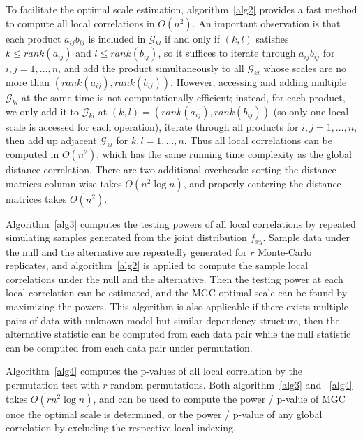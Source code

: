 \documentclass[11pt]{article}
\newcommand{\G}{\mathcal{G}}
\begin{document}
To facilitate the optimal scale estimation, algorithm~\ref{alg2} provides a fast method to compute all local correlations in $O(n^2)$. An important observation is that each product $a_{ij}b_{ij}$ is included in $\G_{kl}$ if and only if $(k,l)$ satisfies $k\leq rank(a_{ij})$ and $l\leq rank(b_{ij})$, so it suffices to iterate through $a_{ij}b_{ij}$ for $i,j=1,\ldots,n$, and add the product simultaneously to all $\G_{kl}$ whose scales are no more than $(rank(a_{ij}),rank(b_{ij}))$. However, accessing and adding multiple $\G_{kl}$ at the same time is not computationally efficient; instead, for each product, we only add it to $\G_{kl}$ at $(k,l)=(rank(a_{ij}),rank(b_{ij}))$ (so only one local scale is accessed for each operation), iterate through all products for $i,j=1,\ldots,n$, then add up adjacent $\G_{kl}$ for $k,l=1,\ldots,n$. Thus all local correlations can be computed in $O(n^2)$, which has the same running time complexity as the global distance correlation. There are two additional overheads: sorting the distance matrices column-wise takes $O(n^2 \log n)$, and properly centering the distance matrices takes $O(n^2)$. 

Algorithm~\ref{alg3} computes the testing powers of all local correlations by repeated simulating samples generated from the joint distribution $f_{xy}$. Sample data under the null and the alternative are repeatedly generated for $r$ Monte-Carlo replicates, and algorithm~\ref{alg2} is applied to compute the sample local correlations under the null and the alternative. Then the testing power at each local correlation can be estimated, and the MGC optimal scale can be found by maximizing the powers. This algorithm is also applicable if there exists multiple pairs of data with unknown model but similar dependency structure, then the alternative statistic can be computed from each data pair while the null statistic can be computed from each data pair under permutation.

Algorithm~\ref{alg4} computes the p-values of all local correlation by the permutation test with $r$ random permutations. Both algorithm~\ref{alg3} and ~\ref{alg4} takes $O(rn^2 \log n)$, and can be used to compute the power / p-value of MGC once the optimal scale is determined, or the power / p-value of any global correlation by excluding the respective local indexing.
\end{document}
